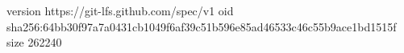 version https://git-lfs.github.com/spec/v1
oid sha256:64bb30f97a7a0431cb1049f6af39c51b596e85ad46533c46c55b9ace1bd1515f
size 262240
